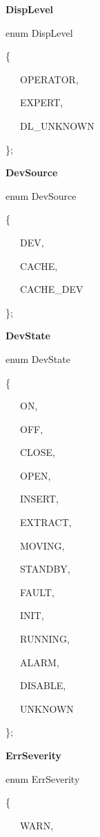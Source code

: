 \begin{flushleft}
\textbf{DispLevel}
\par\end{flushleft}

enum DispLevel

\{

~~~OPERATOR,

~~~EXPERT,

~~~DL\_UNKNOWN

\};\\


\begin{flushleft}
\textbf{DevSource}
\par\end{flushleft}

enum DevSource

\{

~~~DEV,

~~~CACHE,

~~~CACHE\_DEV

\};\\


\begin{flushleft}
\textbf{DevState}
\par\end{flushleft}

enum DevState

\{

~~~ON,

~~~OFF,

~~~CLOSE,

~~~OPEN,

~~~INSERT,

~~~EXTRACT,

~~~MOVING,

~~~STANDBY,

~~~FAULT,

~~~INIT,

~~~RUNNING,

~~~ALARM,

~~~DISABLE,

~~~UNKNOWN

\};\\


\begin{flushleft}
\textbf{ErrSeverity}
\par\end{flushleft}

enum ErrSeverity

\{

~~~WARN,

